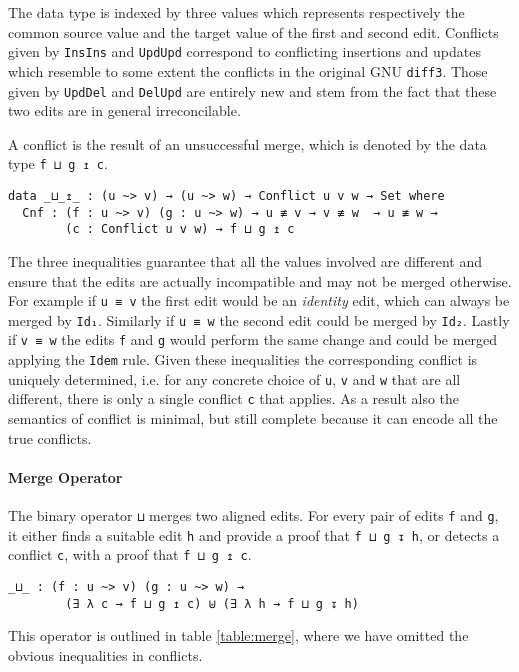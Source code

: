 \documentclass[preprint]{sigplanconf}
\begin{document}
	The data type is indexed by three values which represents respectively
	the common source value and the target value of the first and second
	edit.	Conflicts given by \texttt{InsIns} and \texttt{UpdUpd}	 correspond to 
	conflicting insertions and updates which resemble to some extent the
	conflicts in the original GNU \texttt{diff3}. Those given by \texttt{UpdDel} 
	and \texttt{DelUpd} are entirely new and stem from the fact that these two
	edits are in general irreconcilable.

	A conflict is the result of an unsuccessful merge, which is denoted
	by the data type \texttt{f ⊔ g ↥ c}.

\begin{verbatim}
data _⊔_↥_ : (u ~> v) → (u ~> w) → Conflict u v w → Set where
  Cnf : (f : u ~> v) (g : u ~> w) → u ≢ v → v ≢ w  → u ≢ w → 
        (c : Conflict u v w) → f ⊔ g ↥ c
\end{verbatim}

	The three inequalities guarantee that all the values involved are different
        and ensure that the edits are actually incompatible and may not be merged 
        otherwise. For example if \texttt{u ≡ v} the first edit would be an
        \emph{identity} edit, which can always be merged by
        \texttt{Id₁}. Similarly if \texttt{u ≡ w} the second edit could be merged
        by \texttt{Id₂}. Lastly if \texttt{v ≡ w} the edits \texttt{f} and \texttt{g}
        would perform the same change and could be merged applying the \texttt{Idem}
        rule.
        Given these inequalities the corresponding conflict is uniquely determined,
        i.e. for any concrete choice of \texttt{u}, \texttt{v} and \texttt{w} that
        are all different, there is only a single conflict \texttt{c} that applies.
	As a result also the semantics of conflict is minimal, but still complete
        because it can encode all the true conflicts.

	\paragraph{Merge Operator}
	The binary operator \texttt{⊔} merges 
	two aligned edits. For every pair of edits \texttt{f} and \texttt{g}, 
	it either finds a suitable edit \texttt{h} and provide
	a proof that \texttt{f ⊔ g ↧ h}, or detects a conflict \texttt{c}, 
	with a proof that \texttt{f ⊔ g ↥ c}.

\begin{verbatim}
_⊔_ : (f : u ~> v) (g : u ~> w) →
        (∃ λ c → f ⊔ g ↥ c) ⊎ (∃ λ h → f ⊔ g ↧ h)
\end{verbatim}
	This operator is outlined in table \ref{table:merge}, where we have
        omitted the obvious inequalities in conflicts.
\end{document}
